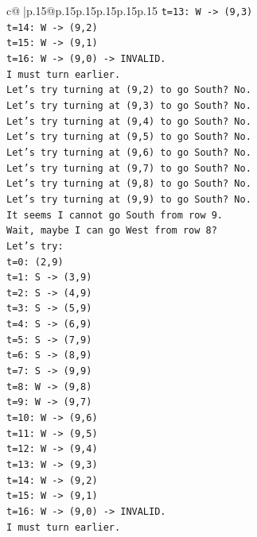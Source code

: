 \documentclass{article}
\begin{document}
{\begin{supertabular}{c@{$\;$}|p{.15\linewidth}@{}p{.15\linewidth}p{.15\linewidth}p{.15\linewidth}p{.15\linewidth}p{.15\linewidth}}
{{{\texttt{t=13: W {-}> (9,3)} \\
\texttt{t=14: W {-}> (9,2)} \\
\texttt{t=15: W {-}> (9,1)} \\
\texttt{t=16: W {-}> (9,0) {-}> INVALID.} \\
\texttt{I must turn earlier.} \\
\texttt{Let's try turning at (9,2) to go South? No.} \\
\texttt{Let's try turning at (9,3) to go South? No.} \\
\texttt{Let's try turning at (9,4) to go South? No.} \\
\texttt{Let's try turning at (9,5) to go South? No.} \\
\texttt{Let's try turning at (9,6) to go South? No.} \\
\texttt{Let's try turning at (9,7) to go South? No.} \\
\texttt{Let's try turning at (9,8) to go South? No.} \\
\texttt{Let's try turning at (9,9) to go South? No.} \\
\texttt{It seems I cannot go South from row 9.} \\
\texttt{Wait, maybe I can go West from row 8?} \\
\texttt{Let's try:} \\
\texttt{t=0: (2,9)} \\
\texttt{t=1: S {-}> (3,9)} \\
\texttt{t=2: S {-}> (4,9)} \\
\texttt{t=3: S {-}> (5,9)} \\
\texttt{t=4: S {-}> (6,9)} \\
\texttt{t=5: S {-}> (7,9)} \\
\texttt{t=6: S {-}> (8,9)} \\
\texttt{t=7: S {-}> (9,9)} \\
\texttt{t=8: W {-}> (9,8)} \\
\texttt{t=9: W {-}> (9,7)} \\
\texttt{t=10: W {-}> (9,6)} \\
\texttt{t=11: W {-}> (9,5)} \\
\texttt{t=12: W {-}> (9,4)} \\
\texttt{t=13: W {-}> (9,3)} \\
\texttt{t=14: W {-}> (9,2)} \\
\texttt{t=15: W {-}> (9,1)} \\
\texttt{t=16: W {-}> (9,0) {-}> INVALID.} \\
\texttt{I must turn earlier.} \\
}}}
\end{supertabular}}
\end{document}
